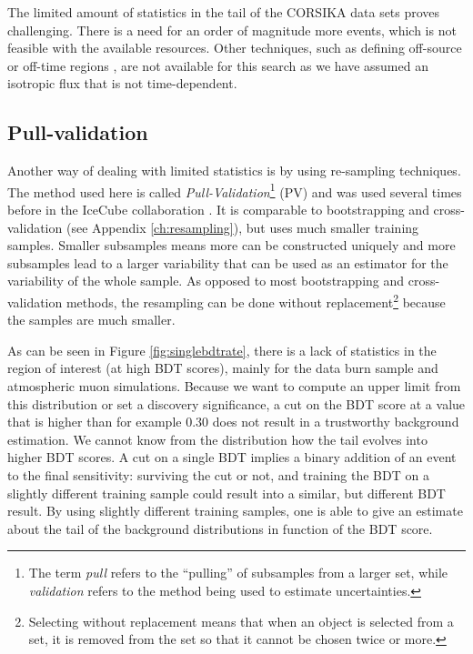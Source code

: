 \noindent The limited amount of statistics in the tail of the CORSIKA data sets proves challenging. There is a need for an order of magnitude more events, which is not feasible with the available resources. Other techniques, such as defining off-source or off-time regions \cite{1352676}, are not available for this search as we have assumed an isotropic flux that is not time-dependent.

\subsection{Pull-validation}
\label{subsec:pv}
Another way of dealing with limited statistics is by using re-sampling techniques. The method used here is called \textit{Pull-Validation}\footnote{The term \textit{pull} refers to the ``pulling'' of subsamples from a larger set, while \textit{validation} refers to the method being used to estimate uncertainties.} (PV) and was used several times before in the IceCube collaboration \cite{Aartsen:2016fep,Aartsen:2015exf,scheriauthesis}. It is comparable to bootstrapping and cross-validation (see Appendix \ref{ch:resampling}), but uses much smaller training samples. Smaller subsamples means more can be constructed uniquely and more subsamples lead to a larger variability that can be used as an estimator for the variability of the whole sample. As opposed to most bootstrapping and cross-validation methods, the resampling can be done without replacement\footnote{Selecting without replacement means that when an object is selected from a set, it is removed from the set so that it cannot be chosen twice or more.} because the samples are much smaller.

As can be seen in Figure \ref{fig:singlebdtrate}, there is a lack of statistics in the region of interest (at high BDT scores), mainly for the data burn sample and atmospheric muon simulations. Because we want to compute an upper limit from this distribution or set a discovery significance, a cut on the BDT score at a value that is higher than for example 0.30 does not result in a trustworthy background estimation. We cannot know from the distribution how the tail evolves into higher BDT scores. A cut on a single BDT implies a binary addition of an event to the final sensitivity: surviving the cut or not, and training the BDT on a slightly different training sample could result into a similar, but different BDT result. By using slightly different training samples, one is able to give an estimate about the tail of the background distributions in function of the BDT score.\\

